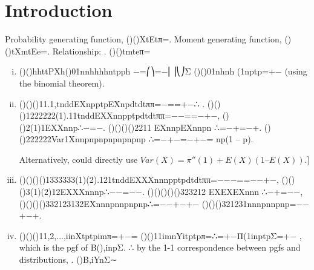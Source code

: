 \documentclass{article}
\author{kobriendublin }
\date{December 2018}
\begin{document}
\section{Introduction}
Probability generating function, ()()XtEtπ=.
Moment generating function, ()()tXmtEe=.
Relationship: . ()()tmteπ=

\begin{enumerate}[(i)]
\item 
()()hhttPXh()01nnhhhhntpph −=⎛⎞=−⎜⎟⎝⎠Σ
()()01nhnh (1nptp=+− (using the binomial theorem).
\item 
()()()11.1,tnddEXnpptpEXnpdtdtππ=−==+−∴ .
()()()1222222(1).11tnddEXXnnpptpdtdtππ=−−==−+−,
()()2(1)1EXXnnp∴−=−.
()()()()2211 EXnnpEXnnpn ∴=−+=−+.
()()222222Var1Xnnpnpnpnpnpnpnp ∴=−+−=−+−= np(1 – p).

Alternatively, could directly use $Var(X) = π ''(1) + E(X)(1 – E(X)).]$
\item ()()()()1333333(1)(2).121tnddEXXXnnnpptpdtdtππ=−−−==−−+−,
()()()3(1)(2)12EXXXnnnp∴−−=−−.
()()()()()323212 EXEXEXnnn ∴−+=−−,
()()()()332123132EXnnnpnnpnpnp∴=−−+−+− ()()()321231nnnpnnpnp=−−+−+.
\item 
()()()11,2,...,iinXtptpimπ=+−=
()()11imnYitptpπ=∴=+−Π(1inptpΣ=+− , which is the pgf of B(),inpΣ.
∴ by the 1-1 correspondence between pgfs and distributions, . ()B,iYnΣ∼
\end{enumerate}
\end{document}
